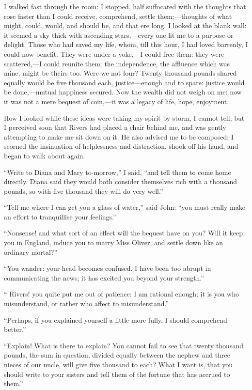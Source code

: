 I walked fast through the room: I stopped, half suffocated with the
thoughts that rose faster than I could receive, comprehend, settle
them:---thoughts of what might, could, would, and should be, and that
ere long. I looked at the blank wall: it seemed a sky thick with
ascending stars,---every one lit me to a purpose or delight. Those who
had saved my life, whom, till this hour, I had loved barrenly, I could
now benefit. They were under a yoke,---I could free them: they were
scattered,---I could reunite them: the independence, the affluence which
was mine, might be theirs too. Were we not four? Twenty thousand
pounds shared equally would be five thousand each, justice---enough and
to spare: justice would be done,---mutual happiness secured. Now the
wealth did not weigh on me: now it was not a mere bequest of coin,---it
was a legacy of life, hope, enjoyment.

How I looked while these ideas were taking my spirit by storm, I cannot
tell; but I perceived soon that \Mr{} Rivers had placed a chair behind me,
and was gently attempting to make me sit down on it. He also advised me
to be composed; I scorned the insinuation of helplessness and
distraction, shook off his hand, and began to walk about again.

\enquote{Write to Diana and Mary to-morrow,} I said, \enquote{and tell
them to come home directly. Diana said they would both consider
themselves rich with a thousand pounds, so with five thousand they will
do very well.}

\enquote{Tell me where I can get you a glass of water,} said \St{} John;
\enquote{you must really make an effort to tranquillise your feelings.}

\enquote{Nonsense! and what sort of an effect will the bequest have on
you? Will it keep you in England, induce you to marry Miss Oliver, and
settle down like an ordinary mortal?}

\enquote{You wander: your head becomes confused. I have been too abrupt
in communicating the news; it has excited you beyond your strength.}

\enquote{\Mr{} Rivers! you quite put me out of patience: I am rational
enough; it is you who misunderstand, or rather who affect to
misunderstand.}

\enquote{Perhaps, if you explained yourself a little more fully, I
should comprehend better.}

\enquote{Explain! What is there to explain? You cannot fail to see
that twenty thousand pounds, the sum in question, divided equally
between the nephew and three nieces of our uncle, will give five
thousand to each? What I want is, that you should write to your sisters
and tell them of the fortune that has accrued to them.}

